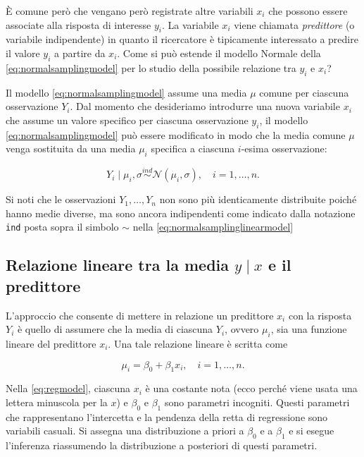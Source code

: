\documentclass[
  10pt,
  italian,
  a4paper,
  extrafontsizes,onecolumn,openright
  ]{memoir}
\begin{document}
È comune però che vengano però registrate altre variabili \(x_i\) che possono essere associate alla risposta di interesse \(y_i\). La variabile \(x_i\) viene chiamata \emph{predittore} (o variabile indipendente) in quanto il ricercatore è tipicamente interessato a predire il valore \(y_i\) a partire da \(x_i\). Come si può estende il modello Normale della \eqref{eq:normalsamplingmodel} per lo studio della possibile relazione tra \(y_i\) e \(x_i\)?

Il modello \eqref{eq:normalsamplingmodel} assume una media \(\mu\) comune per ciascuna osservazione \(Y_i\). Dal momento che desideriamo introdurre una nuova variabile \(x_i\) che assume un valore specifico per ciascuna osservazione \(y_i\), il modello \eqref{eq:normalsamplingmodel} può essere modificato in modo che la media comune \(\mu\) venga sostituita da una media \(\mu_i\) specifica a ciascuna \(i\)-esima osservazione:

\begin{equation}
Y_i \mid \mu_i, \sigma \stackrel{ind}{\sim} \mathcal{N}(\mu_i, \sigma), \quad i = 1, \dots, n.
\label{eq:normalsamplinglinearmodel}
\end{equation}

Si noti che le osservazioni \(Y_1, \dots, Y_n\) non sono più identicamente distribuite poiché hanno medie diverse, ma sono ancora indipendenti come indicato dalla notazione \texttt{ind} posta sopra il simbolo \(\sim\) nella \eqref{eq:normalsamplinglinearmodel}

\hypertarget{relazione-lineare-tra-la-media-y-mid-x-e-il-predittore}{%
\subsection{\texorpdfstring{Relazione lineare tra la media \(y \mid x\) e il predittore}{Relazione lineare tra la media y \textbackslash mid x e il predittore}}\label{relazione-lineare-tra-la-media-y-mid-x-e-il-predittore}}

L'approccio che consente di mettere in relazione un predittore \(x_i\) con la risposta \(Y_i\) è quello di assumere che la media di ciascuna \(Y_i\), ovvero \(\mu_i\), sia una funzione lineare del predittore \(x_i\). Una tale relazione lineare è scritta come

\begin{equation}
\mu_i = \beta_0 + \beta_ 1 x_i, \quad i = 1, \dots, n.
\label{eq:regmodel}
\end{equation}

Nella \eqref{eq:regmodel}, ciascuna \(x_i\) è una costante nota (ecco perché viene usata una lettera minuscola per la \(x\)) e \(\beta_0\) e \(\beta_ 1\) sono parametri incogniti. Questi parametri che rappresentano l'intercetta e la pendenza della retta di regressione sono variabili casuali. Si assegna una distribuzione a priori a \(\beta_0\) e a \(\beta_ 1\) e si esegue l'inferenza riassumendo la distribuzione a posteriori di questi parametri.
\end{document}
